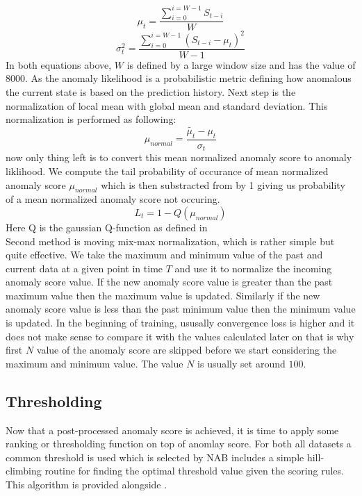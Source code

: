 \documentclass[12pt]{article}
\begin{document}
\begin{equation}
\mu_t = \frac{\sum_{i=0}^{i=W-1} S_{t-i}}{W}
\label{globalMean}
\end{equation}
\begin{equation}
\sigma^2_t=\frac{\sum_{i=0}^{i=W-1} (S_{t-i}-\mu_t)^2}{W-1}
\label{globalStd}
\end{equation}
In both equations above, $W$ is defined by a large window size and has the value of $8000$.
As the anomaly likelihood is a probabilistic metric defining how anomalous the current state is based on the prediction history. Next step is the normalization of local mean with global mean and standard deviation. This normalization is performed as following:
\begin{equation}
\mu_{normal} = \frac{\tilde{\mu_t} - \mu_t}{\sigma_t}
\end{equation}
now only thing left is to convert this mean normalized anomaly score to anomaly liklihood. We compute the tail probability of occurance of mean normalized anomaly score $\mu_{normal}$ which is then substracted from by 1 giving us probability of a mean normalized anomaly score not occuring.
\begin{equation}
L_t = 1-Q (\mu_{normal})
\end{equation}
Here Q is the gaussian Q-function as defined in \cite{GaussianQ}\\
\break
Second method is moving mix-max normalization, which is rather simple but quite effective. We take the maximum and minimum value of the past and current data at a given point in time $T$ and use it to normalize the incoming anomaly score value. If the new anomaly score value is greater than the past maximum value then the maximum value is updated. Similarly if the new anomaly score value is less than the past minimum value then the minimum value is updated. In the beginning of training, ususally convergence loss is higher and it does not make sense to compare it with the values calculated later on that is why first $N$ value of the anomaly score are skipped before we start considering the maximum and minimum value. The value $N$ is usually set around $100$.
\break

\subsection{Thresholding}
Now that a post-processed anomaly score is achieved, it is time to apply some ranking or thresholding function on top of anomlay score. For both all datasets a common threshold is used which is selected by NAB includes a simple hill-climbing routine for finding the optimal threshold value given the scoring rules. This algorithm is provided alongside \cite{DBLP:journals/corr/LavinA15}.
\end{document}
